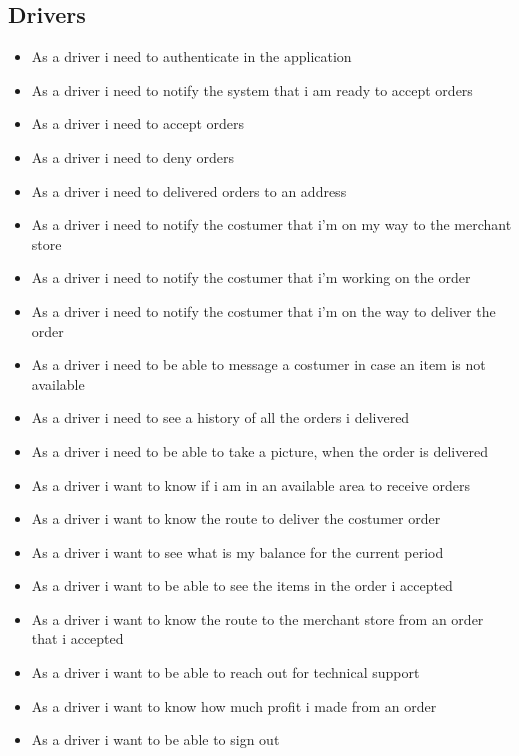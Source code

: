 \subsection{Drivers}
\begin{itemize}
    \item As a driver i need to authenticate in the application
    \item As a driver i need to notify the system that i am ready to 
    accept orders
    \item As a driver i need to accept orders
    \item As a driver i need to deny orders
    \pagebreak
    \item As a driver i need to delivered orders to an address
    \item As a driver i need to notify the costumer that i’m on my way to the 
    merchant store
    \item As a driver i need to notify the costumer that i’m working on the 
    order
    \item As a driver i need to notify the costumer that i’m on the way to 
    deliver the order
    \item As a driver i need to be able to message a costumer in case an 
    item is not available
    \item As a driver i need to see a history of all the orders i delivered
    \item As a driver i need to be able to take a picture, when the order is 
    delivered
    \item As a driver i want to know if i am in an available area to receive 
    orders
    \item As a driver i want to know the route to deliver the costumer order
    \item As a driver i want to see what is my balance for the current period
    \item As a driver i want to be able to see the items in the order i 
    accepted
    \item As a driver i want to know the route to the merchant store from an 
    order that i accepted
    \item As a driver i want to be able to reach out for technical support
    \item As a driver i want to know how much profit i made from an order
    \item As a driver i want to be able to sign out
\end{itemize}
